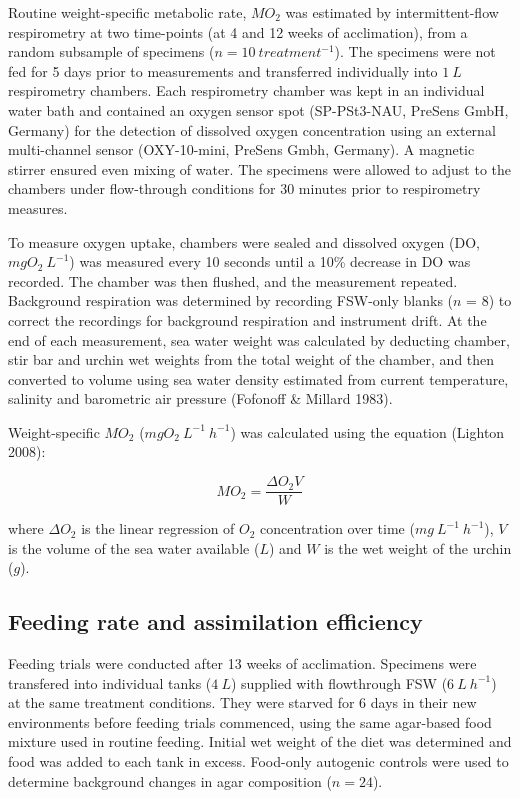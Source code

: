 \documentclass[oneside, a4paper]{memoir}
\theoremstyle{definition}
\theoremstyle{definition}
\theoremstyle{definition}
\theoremstyle{remark}
\begin{document}
Routine weight-specific metabolic rate, \(MO_2\) was estimated by
intermittent-flow respirometry at two time-points (at 4 and 12 weeks of
acclimation), from a random subsample of specimens
(\(n = 10\ treatment^{-1}\)). The specimens were not fed for 5 days
prior to measurements and transferred individually into \(1\ L\)
respirometry chambers. Each respirometry chamber was kept in an
individual water bath and contained an oxygen sensor spot (SP-PSt3-NAU,
PreSens GmbH, Germany) for the detection of dissolved oxygen
concentration using an external multi-channel sensor (OXY-10-mini,
PreSens Gmbh, Germany). A magnetic stirrer ensured even mixing of water.
The specimens were allowed to adjust to the chambers under flow-through
conditions for 30 minutes prior to respirometry measures.

To measure oxygen uptake, chambers were sealed and dissolved oxygen (DO,
\(mgO_2\ L^{-1}\)) was measured every 10 seconds until a 10\% decrease
in DO was recorded. The chamber was then flushed, and the measurement
repeated. Background respiration was determined by recording FSW-only
blanks (\(n\) = 8) to correct the recordings for background respiration
and instrument drift. At the end of each measurement, sea water weight
was calculated by deducting chamber, stir bar and urchin wet weights
from the total weight of the chamber, and then converted to volume using
sea water density estimated from current temperature, salinity and
barometric air pressure (Fofonoff \& Millard 1983).

Weight-specific \(MO_2\) (\(mgO_2\ L^{-1}\ h^{-1}\)) was calculated
using the equation (Lighton 2008):

\begin{equation}
  MO_2 = \frac{\Delta O_2V}{W}
  \label{eq:mo2}
\end{equation}

\noindent where \(\Delta O_2\) is the linear regression of \(O_2\)
concentration over time (\(mg\ L^{-1}\ h^{-1}\)), \(V\) is the volume of
the sea water available (\(L\)) and \(W\) is the wet weight of the
urchin (\(g\)).

\subsection{Feeding rate and assimilation
efficiency}\label{feeding-rate-and-assimilation-efficiency}

Feeding trials were conducted after 13 weeks of acclimation. Specimens
were transfered into individual tanks (\(4\ L\)) supplied with
flowthrough FSW (\(6\ L\ h^{-1}\)) at the same treatment conditions.
They were starved for 6 days in their new environments before feeding
trials commenced, using the same agar-based food mixture used in routine
feeding. Initial wet weight of the diet was determined and food was
added to each tank in excess. Food-only autogenic controls were used to
determine background changes in agar composition (\(n = 24\)).
\end{document}
